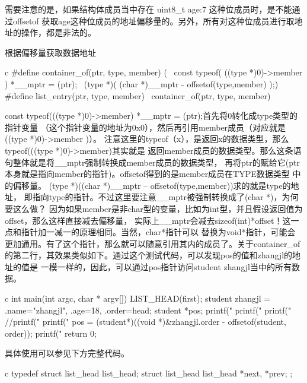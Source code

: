 \begin{outline}[enumerate]
需要注意的是，如果结构体成员当中存在 uint8\_t age:7 这种位成员时，是不能通过offsetof
获取age这种位成员的地址偏移量的。另外，所有对这种位成员进行取地址的操作，都是非法的。

\1 根据偏移量获取数据地址
\begin{code-block}{c}
#define container_of(ptr, type, member) ({                           \
        const typeof( ((type *)0)->member ) *__mptr = (ptr);         \
        (type *)( (char *)__mptr - offsetof(type,member) );})
#define list_entry(ptr, type, member)                                \
        container_of(ptr, type, member)
\end{code-block}

const typeof(((type *)0)->member) *\_\_mptr = (ptr);首先将0转化成type类型的指针变量
（这个指针变量的地址为0x0），然后再引用member成员（对应就是((type *)0)->member )）。
注意这里的typeof（x），是返回x的数据类型，那么 typeof(((type *)0)->member)其实就是
返回member成员的数据类型。那么这条语句整体就是将\_\_mptr强制转换成member成员的数据类型，
再将ptr的赋给它(ptr本身就是指向member的指针)。offsetof得到的是member成员在TYPE数据类型
中的偏移量。 (type *)((char *)\_\_mptr – offsetof(type,member))求的就是type的地址，
即指向type的指针。不过这里要注意\_\_mptr被强制转换成了(char *)，为何要这么做？
因为如果member是非char型的变量，比如为int型，并且假设返回值为offset，那么这样直接减去偏移量，
实际上\_\_mptr会减去sizeof(int)*offset！这一点和指针加一减一的原理相同。当然，char*指针可以
替换为void*指针，可能会更加通用。有了这个指针，那么就可以随意引用其内的成员了。关于container\_of
的第二行，其效果类似如下。通过这个测试代码，可以发现pos的值和zhangjl的地址的值是
一模一样的，因此，可以通过pos指针访问student zhangjl当中的所有数据。
\begin{code-block}{c}
int main(int argc, char * argv[])
{
        LIST_HEAD(first);
        student zhangjl = {.name="zhangjl", .age=18, .order=head};
        student *pos;
        printf("%
        printf("%
        printf("%
        //printf("%
        printf("%
        pos = (student*)((void *)&zhangjl.order - offsetof(student, order));
        printf("%
        return 0;
}
\end{code-block}

具体使用可以参见下方完整代码。
\begin{code-block}{c}
typedef struct list_head list_head;
struct list_head {
        list_head *next, *prev;
};


\end{code-block}
\end{outline}
